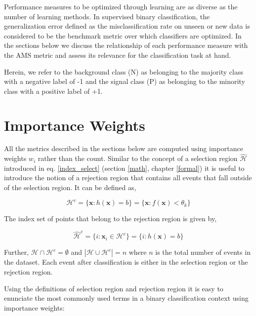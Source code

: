 
Performance measures to be optimized through learning are as diverse as the number of learning methods. In supervised binary classification, the generalization error defined as the misclassification rate on unseen or new data is considered to be the benchmark metric over which classifiers are optimized. 
In the sections below we discuss the relationship of each performance measure with the AMS metric and assess its relevance for the classification task at hand. 

Herein, we refer to the background class (N) as belonging to the majority class with a negative label of -1 and the signal class (P) as belonging to the minority class with a positive label of +1. 

\section{Importance Weights}

All the metrics described in the sections below are computed using importance weights $w_{i}$ rather than the count. Similar to the concept of a selection region $\mathcal{\hat{H}}$ introduced in eq. \ref{index_select} (section \ref{math}, chapter \ref{formal}) it is useful to introduce the notion of a rejection region that contains all events that fall outside of the selection region. It can be defined as, 

\begin{equation}
\mathcal{H}^{c} = \{\mathbf{x} : h(\mathbf{x}) = b\} = \{\mathbf{x} : f(\mathbf{x}) < \theta_{k}\}
\label{rejection}
\end{equation}

The index set of points that belong to the rejection region is given by, 

\begin{equation}
\mathcal{\hat{H}}^{c} = \{i : \mathbf{x}_{i} \in \mathcal{H}^{c}\} = \{i : h(\mathbf{x}) = b\} 
\end{equation}

Further, $\mathcal{H} \cap \mathcal{H}^{c} = \emptyset$ and $|\mathcal{H} \cup \mathcal{H}^{c}| = n$ where $n$ is the total  number of events in the dataset. Each event after classification is either in the selection region or the rejection region. 

Using the definitions of selection region and rejection region it is easy to enunciate the most commonly used terms in a binary classification context using importance weights:

